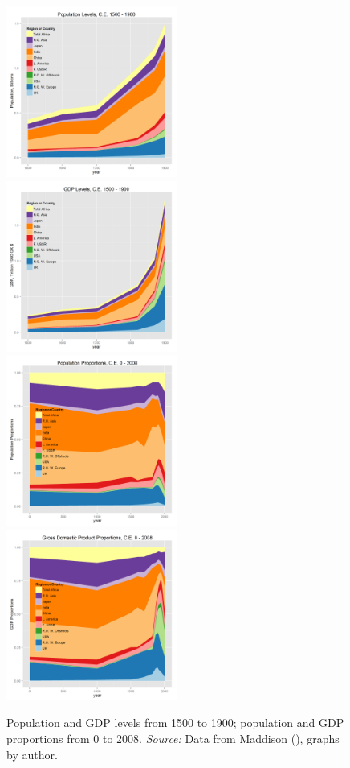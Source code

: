 \documentclass[12pt]{article}
\numberwithin{equation}{section}
\begin{document}
		\begin{figure}[]
		\includegraphics[width=0.5\textwidth]{maddisonregpoplevels1900.png}
		\includegraphics[width=0.5\textwidth]{maddisonreggdplevels1900.png}\\
		\includegraphics[width=0.5\textwidth]{maddisonregpoppct.png}
		\includegraphics[width=0.5\textwidth]{maddisonreggdppct.png}
		\caption{Population and GDP levels from 1500 to 1900; population and GDP proportions from 0 to 2008. \textit{Source:} Data from Maddison (\citeyear{maddison_maddison_2010}), graphs by author.}
		\label{fig:poplevel1900}
		\end{figure}	
		
\end{document}
